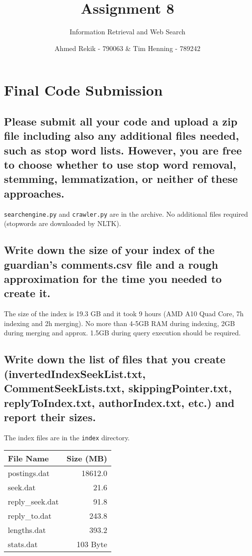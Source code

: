 \documentclass{scrartcl}
\title{Assignment 8}
\subtitle{Information Retrieval and Web Search}
\author{Ahmed Rekik - 790063 \& Tim Henning - 789242}
\begin{document}
\maketitle

\setcounter{section}{0}
\section {Final Code Submission}

\subsection{Please submit all your code and upload a zip file including also any additional files needed, such as stop word lists. However, you are free to choose whether to use stop word removal, stemming, lemmatization, or neither of these approaches.}

\texttt{searchengine.py} and \texttt{crawler.py} are in the archive. No additional files required (stopwords are downloaded by NLTK).

\subsection{Write down the size of your index of the guardian’s comments.csv file and a rough approximation for the time you needed to create it.}

The size of the index is 19.3 GB and it took 9 hours (AMD A10 Quad Core, 7h indexing and 2h merging). No more than 4-5GB RAM during indexing, 2GB during merging and approx. 1.5GB during query execution should be required.

\subsection{Write down the list of files that you create (invertedIndexSeekList.txt, CommentSeekLists.txt, skippingPointer.txt, replyToIndex.txt, authorIndex.txt, etc.) and report their sizes.}

The index files are in the \texttt{index} directory.

\bigskip
\begin{tabular}{l|r}
	File Name & Size (MB) \\
	\hline
	postings.dat & 18612.0 \\
	seek.dat & 21.6 \\
	reply\_seek.dat & 91.8 \\
	reply\_to.dat & 243.8 \\
	lengths.dat & 393.2 \\
	stats.dat & 103 Byte \\
\end{tabular}
\end{document}
